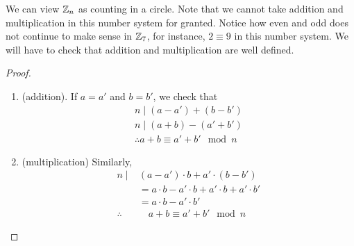 \documentclass{article}
\begin{document}
We can view $\mathbb{Z}_n$ as counting in a circle.
Note that we cannot take addition and multiplication in this number system for granted. Notice how even and odd does not continue to make sense in $\mathbb{Z}_7$, for instance, $2 \equiv 9$ in  this number system. We will have to check that addition and multiplication are well defined.

\begin{proof}\leavevmode
    \begin{enumerate}
        \item (addition). If $a = a'$ and $b = b'$, we check that
        \begin{align*}
            n \mid (a - a') + (b - b') \\
            n \mid (a + b) - (a' + b') \\
            \therefore a + b \equiv a' + b' \mod n
        \end{align*}
        
        \item (multiplication) Similarly,
        \begin{align*}
            n \mid& (a - a')\cdot b + a' \cdot(b - b') \\
            &= a \cdot b - a' \cdot b + a' \cdot b + a' \cdot b' \\
            &= a \cdot b - a' \cdot b' \\
            \therefore& \quad a + b \equiv a' + b' \mod n
        \end{align*}
    \end{enumerate}
\end{proof}

\end{document}
